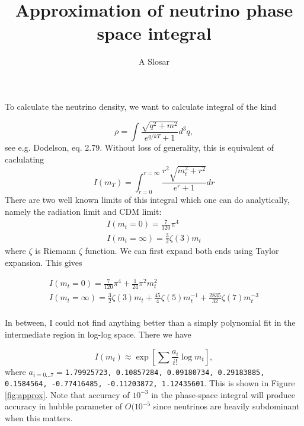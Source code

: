 \documentclass[12pt]{article}
\begin{document}
\author{A Slosar}
\title{Approximation of neutrino phase space integral}
\maketitle

To calculate the neutrino density, we want to calculate integral of
the kind

\begin{equation}
  \rho = \int  \frac{\sqrt{q^2+m^2}}{e^{q/kT}+1} d^3q,
\end{equation}
see e.g. Dodelson, eq. 2.79. Without loss of generality, this is
equivalent of caclulating
\begin{equation}
  I(m_T) = \int_{r=0}^{r=\infty} \frac{r^2 \sqrt{m_t^2+r^2}}{e^r+1} dr
\end{equation}
There are two well known limits of this integral which one can do
analytically, namely the radiation limit and CDM limit:
\begin{eqnarray}
  I(m_t=0) = \frac{7}{120} \pi^4 \\
  I(m_t=\infty) = \frac{3}{2} \zeta(3) m_t
\end{eqnarray}
where $\zeta$ is Riemann $\zeta$ function. 
We can first expand both ends using Taylor expansion. This gives

\begin{eqnarray}
  I(m_t=0) = \frac{7}{120} \pi^4 + \frac{1}{24} \pi^2 m_t^2 \\
  I(m_t=\infty) = \frac{3}{2} \zeta(3) m_t + \frac{45}{4} \zeta(5)
  m_t^{-1} + \frac{2835}{32}\zeta(7)m_t^{-3}\\
\end{eqnarray}


In between, I could not find anything better than a simply polynomial
fit in the intermediate region in log-log space.
There we have

\begin{equation}
  I(m_t) \approx \exp\left[ \sum \frac{a_i}{i!} \log m_t \right],
\end{equation}
where $a_{i=0\ldots7}=$\texttt{1.79925723, 0.10857284, 0.09180734,
  0.29183885, 0.1584564, -0.77416485, -0.11203872, 1.12435601}.
This is shown in Figure \ref{fig:approx}. Note that accuracy of
$10^{-3}$ in the phase-space integral will produce accuracy in hubble
parameter of $O(10^{-5}$ since neutrinos are heavily subdominant when
this matters.
\end{document}
